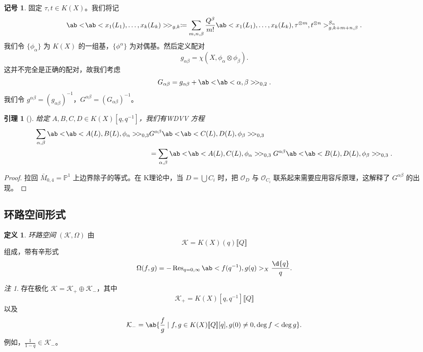 \documentclass{amsart}
\newtheorem{lem}[thm]{引理}
\theoremstyle{definition}
\newtheorem{defn}[thm]{定义}
\newtheorem{notn}[thm]{记号}
\theoremstyle{remark}
\newtheorem{rmk}[thm]{注}
\theoremstyle{plain}
\theoremstyle{definition}
\theoremstyle{remark}
\renewcommand{\P}{\mathbb{P}}
\newcommand{\mc}[1]{\mathcal{#1}}
\newcommand{\on}[1]{\operatorname{#1}}
\newcommand{\1}{\mathbf{1}}
\newcommand{\2}{\mathbf{2}}
\newcommand{\3}{\mathbf{3}}
\newcommand{\ps}[1]{\llbracket #1 \rrbracket}
\begin{document}
\begin{notn}
    固定 \(\tau, t \in K(X)\)。我们将记
    \[ \ab<\!\ab<x_1(L_1), \ldots, x_k(L_k)>\!>_{g,k} \coloneqq \sum_{m,n,\beta} \frac{Q^{\beta}}{m!} \ab<x_1(L_1), \ldots, x_k(L_k), \tau^{\otimes m}, t^{\otimes n}>_{g,k+m+n,\beta}^{S_n}. \]
    我们令 \(\{\phi_{\alpha}\}\) 为 \(K(X)\) 的一组基，\(\{\phi^{\alpha}\}\) 为对偶基。然后定义配对
    \[ g_{\alpha\beta} = \chi(X, \phi_{\alpha} \otimes \phi_{\beta}). \]
    这并不完全是正确的配对，故我们考虑
    \[ G_{\alpha\beta} = g_{\alpha\beta} + \ab<\!\ab<\alpha,\beta>\!>_{0,2}. \]
    我们令 \(g^{\alpha\beta} = (g_{\alpha\beta})^{-1}\)，\(G^{\alpha\beta} = (G_{\alpha\beta})^{-1}\)。
\end{notn}

\begin{lem}[{\cite{Givental2000K}}]
    给定 \(A,B,C,D \in K(X)[q,q^{-1}]\)，我们有\textit{WDVV 方程}
    \begin{align*}
        \sum_{\alpha,\beta} \ab<\!\ab< A(L), B(L), \phi_{\alpha}>\! >_{0,3}& G^{\alpha\beta}\ab<\!\ab< C(L), D(L), \phi_{\beta}>\! >_{0,3} \\
        &= \sum_{\alpha,\beta} \ab<\!\ab< A(L), C(L), \phi_{\alpha}>\! >_{0,3} G^{\alpha\beta}\ab<\!\ab< B(L), D(L), \phi_{\beta}>\! >_{0,3}. 
    \end{align*}
\end{lem}

\begin{proof}
    拉回 \(\bar{M}_{0,4} = \P^1\) 上边界除子的等式。在 K理论中，当 \(D = \bigcup C_i\) 时，把 \(\mc{O}_D\) 与 \(\mc{O}_{C_i}\) 联系起来需要应用容斥原理，这解释了 \(G^{\alpha\beta}\) 的出现。
\end{proof}

\subsection{环路空间形式}%
\label{sub:Loop space formalism}

\begin{defn}
    \textit{环路空间} \((\mc{K}, \Omega)\) 由
    \[ \mc{K} = K(X)(q) \ps{Q}\]
    组成，带有辛形式
    \[ \Omega(f, g) = - \on{Res}_{q = 0, \infty} \ab<f(q^{-1}), g(q)>_X \frac{\d{q}}{q}. \]
\end{defn}

\begin{rmk}
    存在极化 \(\mc{K} = \mc{K}_+ \oplus \mc{K}_-\)，其中
    \[ \mc{K}_+ = K(X)[q, q^{-1}]\ps{Q} \]
    以及
    \[ \mc{K}_- = \ab\{ \frac{f}{g} \mid f, g \in K(X)\ps{Q}[q], g(0) \neq 0, \deg f < \deg g\}. \]
    例如，\(\frac{1}{1-q} \in \mc{K}_-\)。
\end{rmk}
\end{document}
